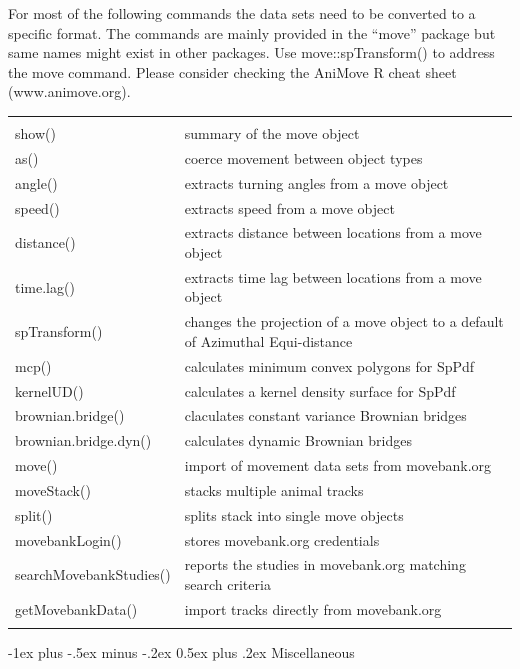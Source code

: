 \documentclass[10pt,landscape]{article}
\makeatletter
\renewcommand{\section}{\@startsection{section}{1}{0mm}%
                                {-1ex plus -.5ex minus -.2ex}%
                                {0.5ex plus .2ex}%
                                {\normalfont\large\bfseries}}
\makeatother
\begin{document}
\begin{multicols}{3}
For most of the following commands the data sets need to be converted to a specific format. The commands are mainly provided in the ``move'' package but same names might exist in other packages. Use move::spTransform() to address the move command. Please consider checking the AniMove R cheat sheet (www.animove.org).


\begin{tabular}{@{}p{\the\MyLen}%
                @{}p{\linewidth-\the\MyLen}@{}}
                & \\
show() & summary of the move object \\
as() & coerce movement between object types \\
angle() &  extracts turning angles from a move object\\
speed() & extracts speed from a move object \\  
distance() & extracts distance between locations from a move object \\
time.lag() & extracts time lag between locations from a move object \\
spTransform() & changes the projection of a move object to a default of Azimuthal Equi-distance \\
mcp() & calculates minimum convex polygons for SpPdf \\
kernelUD() & calculates a kernel density surface for SpPdf \\
brownian.bridge() & claculates constant variance Brownian bridges \\
brownian.bridge.dyn() & calculates dynamic Brownian bridges \\
move() & import of movement data sets from movebank.org  \\
moveStack() & stacks multiple animal tracks \\
split() & splits stack into single move objects \\
movebankLogin() & stores movebank.org credentials \\
searchMovebankStudies() & reports the studies in movebank.org matching search criteria\\
getMovebankData() & import tracks directly from movebank.org \\

& 

\end{tabular}




\section{Miscellaneous}


\end{multicols}
\end{document}
